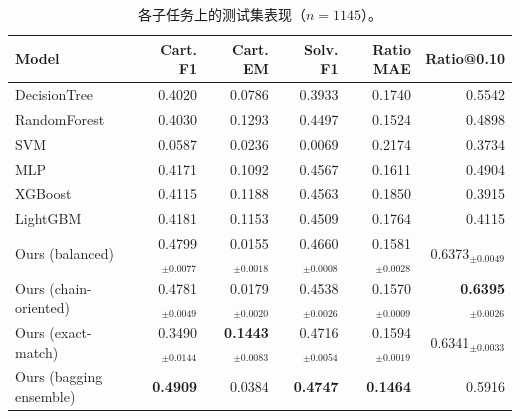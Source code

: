 \begin{table}[t]
\centering
\small
\caption{各子任务上的测试集表现（$n=1145$）。}
\label{tab:per-task}
\begin{tabular}{lrrrrr}
\toprule
Model & Cart. F1 & Cart. EM & Solv. F1 & Ratio MAE & Ratio@0.10 \\
\midrule
DecisionTree & 0.4020 & 0.0786 & 0.3933 & 0.1740 & 0.5542 \\
RandomForest & 0.4030 & 0.1293 & 0.4497 & 0.1524 & 0.4898 \\
SVM & 0.0587 & 0.0236 & 0.0069 & 0.2174 & 0.3734 \\
MLP & 0.4171 & 0.1092 & 0.4567 & 0.1611 & 0.4904 \\
XGBoost & 0.4115 & 0.1188 & 0.4563 & 0.1850 & 0.3915 \\
LightGBM & 0.4181 & 0.1153 & 0.4509 & 0.1764 & 0.4115 \\
\midrule
Ours (balanced) & 0.4799$_{\pm 0.0077}$ & 0.0155$_{\pm 0.0018}$ & 0.4660$_{\pm 0.0008}$ & 0.1581$_{\pm 0.0028}$ & 0.6373$_{\pm 0.0049}$ \\
Ours (chain-oriented) & 0.4781$_{\pm 0.0049}$ & 0.0179$_{\pm 0.0020}$ & 0.4538$_{\pm 0.0026}$ & 0.1570$_{\pm 0.0009}$ & \textbf{0.6395$_{\pm 0.0026}$} \\
Ours (exact-match) & 0.3490$_{\pm 0.0144}$ & \textbf{0.1443$_{\pm 0.0083}$} & 0.4716$_{\pm 0.0054}$ & 0.1594$_{\pm 0.0019}$ & 0.6341$_{\pm 0.0033}$ \\
Ours (bagging ensemble) & \textbf{0.4909} & 0.0384 & \textbf{0.4747} & \textbf{0.1464} & 0.5916 \\
\bottomrule
\end{tabular}
\vspace{2pt}{\footnotesize 输入统一为 21 维分子描述符。我们的单模型报 4 次重复（同一数据划分、不同随机初始化）的均值与标准差；集成与传统基线是确定的单个模型，报单次结果。加粗为该列最优。}
\end{table}
